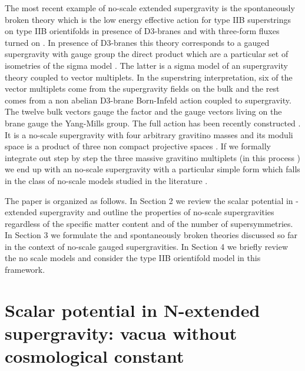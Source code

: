 \documentclass[a4paper,12pt]{article}
\begin{document}
The most recent example of no-scale extended supergravity is the
\coordHE{} spontaneously broken theory \cite{adfl3,tz} which is the low
energy effective action for type IIB superstrings on type IIB
orientifolds in presence of D3-branes and with three-form fluxes
turned on \cite{fp}. In presence of \coordHE{} D3-branes  this theory
corresponds to a gauged supergravity with gauge group the direct
product \coordHE{} which are a particular set of
isometries of the sigma model
\coordHE{}. The latter is a sigma
model of an \coordHE{} supergravity theory coupled to \coordHE{} vector
multiplets. In the superstring interpretation, six of the vector
multiplets come from the supergravity fields on the bulk and the
rest comes from a non abelian D3-brane Born-Infeld action coupled
to supergravity. The twelve bulk vectors gauge the \coordHE{} factor
and the gauge vectors living on the brane gauge the \coordHE{}
Yang-Mills  group. The full action has been recently constructed
\cite{dfv}. It is a no-scale \coordHE{} supergravity with four
arbitrary gravitino masses and its moduli space is a product of
three non compact projective spaces
\coordHE{} \cite{fpo}.  If we formally
integrate out step by step the three massive gravitino multiplets
(in this process \coordHE{}) we end up with an \coordHE{} no-scale supergravity with a
particular simple form  which falls in the class of no-scale
models studied in the literature \cite{ln}.

 \bigskip

 The paper is organized as follows. In Section 2 we review the scalar potential in
\coordHE{}-extended supergravity and outline the properties of no-scale
supergravities regardless of the specific matter content and of
the number of supersymmetries. In Section 3 we formulate the \coordHE{}
and \coordHE{} spontaneously broken theories discussed so far in the
context of no-scale gauged supergravities. In Section 4 we briefly
review the \coordHE{} no scale models and consider the \coordHE{} type IIB
orientifold model in this framework.

 \section{Scalar potential in N-extended supergravity: vacua without cosmological constant}
\end{document}
